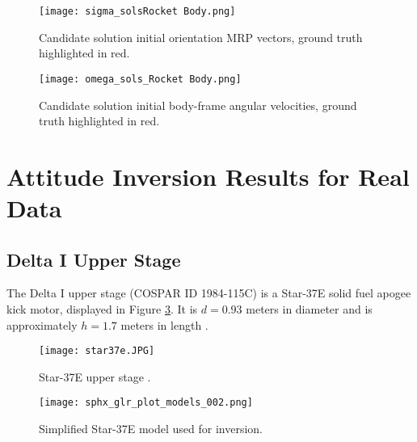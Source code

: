 \documentclass[a4paper,twocolumn]{spaceDebrisC} %
\newcommand{\figbig}[0]{0.5\textwidth}
\newcommand{\figmed}[0]{0.4\textwidth}
\newcommand{\figsmall}[0]{0.3\textwidth}
\begin{document}
\begin{figure}[H]
  \centering
  \texttt{[image: sigma\_solsRocket Body.png]}
  \caption{Candidate solution initial orientation MRP vectors, ground truth highlighted in red.}
  \label{fig:sigma_sols1}
\end{figure}

\begin{figure}[H]
  \centering
  \texttt{[image: omega\_sols\_Rocket Body.png]}
  \caption{Candidate solution initial body-frame angular velocities, ground truth highlighted in red.}
  \label{fig:omega_sols1}
\end{figure}




\section{Attitude Inversion Results for Real Data}


\subsection{Delta I Upper Stage}

The Delta I upper stage (COSPAR ID 1984-115C) is a Star-37E \cite{delta3914_astronautix} solid fuel apogee kick motor, displayed in Figure \ref{fig:star37e}. It is $d=0.93$ meters in diameter and is approximately $h=1.7$ meters in length \cite{star37e_astronautix, star37_gunter}.

\begin{figure}[H]
  \centering
  \texttt{[image: star37e.JPG]}
  \caption{Star-37E upper stage \cite{star37_af}.}
  \label{fig:star37e}
\end{figure}

\begin{figure}[H]
  \centering
  \texttt{[image: sphx\_glr\_plot\_models\_002.png]}
  \caption{Simplified Star-37E model used for inversion.}
  \label{fig:star37e_simple}
\end{figure}
\end{document}
